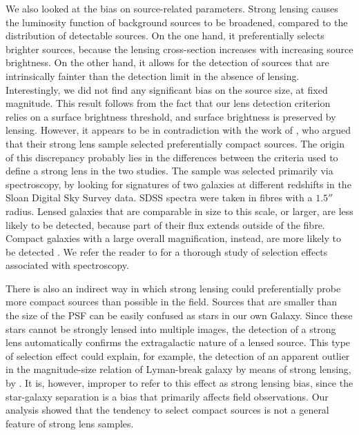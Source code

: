 \documentclass{aa}
\begin{document}
We also looked at the bias on source-related parameters.
Strong lensing causes the luminosity function of background sources to be broadened, compared to the distribution of detectable sources.
On the one hand, it preferentially selects brighter sources, because the lensing cross-section increases with increasing source brightness.
On the other hand, it allows for the detection of sources that are intrinsically fainter than the detection limit in the absence of lensing.
Interestingly, we did not find any significant bias on the source size, at fixed magnitude.
This result follows from the fact that our lens detection criterion relies on a surface brightness threshold, and surface brightness is preserved by lensing.
However, it appears to be in contradiction with the work of \citet{O+A17}, who argued that their strong lens sample selected preferentially compact sources.
The origin of this discrepancy probably lies in the differences between the criteria used to define a strong lens in the two studies.
The \citet{O+A17} sample was selected primarily via spectroscopy, by looking for signatures of two galaxies at different redshifts in the Sloan Digital Sky Survey \citep[SDSS][]{Yor++00} data.
SDSS spectra were taken in fibres with a $1.5''$ radius.
Lensed galaxies that are comparable in size to this scale, or larger, are less likely to be detected, because part of their flux extends outside of the fibre. Compact galaxies with a large overall magnification, instead, are more likely to be detected \citep[see the discussion in section 5.3 of][]{O+A17}.
We refer the reader to \citet{Arn++12} for a thorough study of selection effects associated with spectroscopy.

There is also an indirect way in which strong lensing could preferentially probe more compact sources than possible in the field.
Sources that are smaller than the size of the PSF can be easily confused as stars in our own Galaxy.
Since these stars cannot be strongly lensed into multiple images, the detection of a strong lens automatically confirms the extragalactic nature of a lensed source.
This type of selection effect could explain, for example, the detection of an apparent outlier in the magnitude-size relation of Lyman-break galaxy by means of strong lensing, by \citet{Jae++20}.
It is, however, improper to refer to this effect as strong lensing bias, since the star-galaxy separation is a bias that primarily affects field observations.
Our analysis showed that the tendency to select compact sources is not a general feature of strong lens samples.
\end{document}
